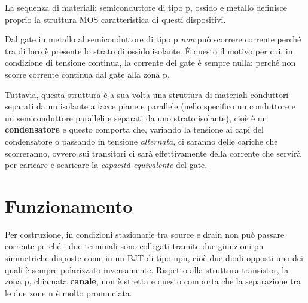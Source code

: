 \documentclass[12pt, a4paper]{report}
\begin{document}
La sequenza di materiali: semiconduttore di tipo p, ossido e metallo definisce proprio la struttura MOS caratteristica di questi dispositivi.

Dal gate in metallo al semiconduttore di tipo p \textit{non} può scorrere corrente perché tra di loro è presente lo strato di ossido isolante. È questo il motivo per cui, in condizione di tensione continua, la corrente del gate è sempre nulla: perché non scorre corrente continua dal gate alla zona p. 

Tuttavia, questa struttura è a sua volta una struttura di materiali conduttori separati da un isolante a facce piane e parallele (nello specifico un conduttore e un semiconduttore paralleli e separati da uno strato isolante), cioè è un \textbf{condensatore} e questo comporta che, variando la tensione ai capi del condensatore o passando in tensione \textit{alternata}, ci saranno delle cariche che scorreranno, ovvero sui transitori ci sarà effettivamente della corrente che servirà per caricare e scaricare la \textit{capacità equivalente} del gate.

\section{Funzionamento}
Per costruzione, in condizioni stazionarie tra source e drain non può passare corrente perché i due terminali sono collegati tramite due giunzioni pn simmetriche disposte come in un BJT di tipo npn, cioè due diodi opposti uno dei quali è sempre polarizzato inversamente. Rispetto alla struttura transistor, la zona p, chiamata \textbf{canale}, non è stretta e questo comporta che la separazione tra le due zone n è molto pronunciata.
\end{document}
